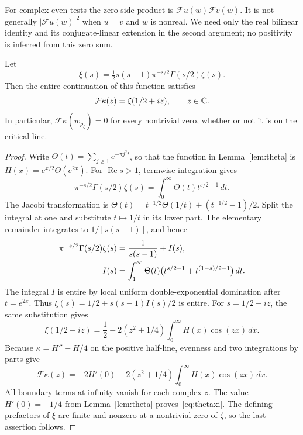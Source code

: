For complex even tests the zero-side product is
$\mathcal Fu(w)\overline{\mathcal Fv(\overline w)}$. It is not generally $|\mathcal Fu(w)|^2$ when $u=v$ and $w$ is nonreal. We need only the real bilinear identity and its conjugate-linear extension in the second argument; no positivity is inferred from this zero sum.

\begin{lemma}\label{lem:thetaxi}
Let
\[
 \xi(s)=\tfrac12s(s-1)\pi^{-s/2}\Gamma(s/2)\zeta(s).
\]
Then the entire continuation of this function satisfies
\begin{equation}\label{eq:thetaxi}
 \mathcal F\kappa(z)=\xi(1/2+iz),\qquad z\in\mathbb C.
\end{equation}
In particular, $\mathcal F\kappa(w_{\rho_\zeta})=0$ for every nontrivial zero, whether or not it is on the critical line.
\end{lemma}
\begin{proof}
Write $\Theta(t)=\sum_{j\ge1}e^{-\pi j^2t}$, so that the function in Lemma~\ref{lem:theta} is $H(x)=e^{x/2}\Theta(e^{2x})$. For $\operatorname{Re}s>1$, termwise integration gives
\[
 \pi^{-s/2}\Gamma(s/2)\zeta(s)
   =\int_0^\infty\Theta(t)t^{s/2-1}\,dt.
\]
The Jacobi transformation is
$\Theta(t)=t^{-1/2}\Theta(1/t)+(t^{-1/2}-1)/2$.
Split the integral at one and substitute $t\mapsto1/t$ in its lower part. The elementary remainder integrates to $1/[s(s-1)]$, and hence
\begin{align}\label{eq:mellintheta}
 \pi^{-s/2}\Gamma(s/2)\zeta(s)
 &=\frac1{s(s-1)}+I(s),\notag\\
 I(s)&=\int_1^\infty\Theta(t)
       \bigl(t^{s/2-1}+t^{(1-s)/2-1}\bigr)\,dt.
\end{align}
The integral $I$ is entire by local uniform double-exponential domination after $t=e^{2x}$. Thus
$\xi(s)=1/2+s(s-1)I(s)/2$ is entire. For $s=1/2+iz$, the same substitution gives
\begin{equation}\label{eq:xiH}
 \xi(1/2+iz)=\frac12
       -2(z^2+1/4)\int_0^\infty H(x)\cos(zx)\,dx.
\end{equation}
Because $\kappa=H''-H/4$ on the positive half-line, evenness and two integrations by parts give
\[
 \mathcal F\kappa(z)
  =-2H'(0)-2(z^2+1/4)\int_0^\infty H(x)\cos(zx)\,dx.
\]
All boundary terms at infinity vanish for each complex $z$. The value $H'(0)=-1/4$ from Lemma~\ref{lem:theta} proves~\eqref{eq:thetaxi}. The defining prefactors of $\xi$ are finite and nonzero at a nontrivial zero of $\zeta$, so the last assertion follows.
\end{proof}

